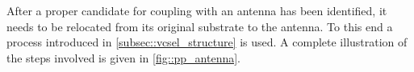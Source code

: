 			After a proper candidate for coupling with an antenna has been identified, it needs to be relocated from its original substrate to the antenna. To this end a \pp process introduced in \cref{subsec::vcsel_structure} is used. A complete illustration of the steps involved is given in \cref{fig::pp_antenna}.

			\begin{figure}[htp]
				\begin{subfigure}[t]{ 0.49\linewidth}
					\centering
					\caption{}
					\label{subfig::pp_target_antenna}
				\end{subfigure}
				\hfill
				\begin{subfigure}[t]{ 0.49\linewidth}
					\centering

\end{subfigure}
\end{figure}
